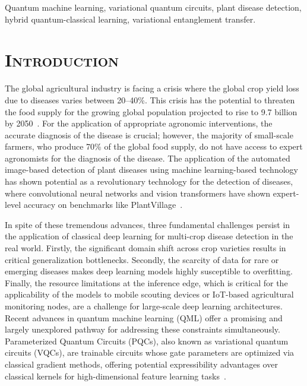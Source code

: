 \documentclass[conference]{IEEEtran}
\begin{document}
\begin{IEEEkeywords}
Quantum machine learning, variational quantum circuits, plant disease detection, hybrid quantum-classical learning, variational entanglement transfer.
\end{IEEEkeywords}

\section{\textsc{Introduction}}

The global agricultural industry is facing a crisis where the global crop yield loss due to diseases varies between 20--40\%. This crisis has the potential to threaten the food supply for the growing global population projected to rise to 9.7 billion by 2050~\cite{fao2023}. For the application of appropriate agronomic interventions, the accurate diagnosis of the disease is crucial; however, the majority of small-scale farmers, who produce 70\% of the global food supply, do not have access to expert agronomists for the diagnosis of the disease. The application of the automated image-based detection of plant diseases using machine learning-based technology has shown potential as a revolutionary technology for the detection of diseases, where convolutional neural networks and vision transformers have shown expert-level accuracy on benchmarks like PlantVillage~\cite{mohanty2016}.

In spite of these tremendous advances, three fundamental challenges persist in the application of classical deep learning for multi-crop disease detection in the real world. Firstly, the significant domain shift across crop varieties results in critical generalization bottlenecks. Secondly, the scarcity of data for rare or emerging diseases makes deep learning models highly susceptible to overfitting. Finally, the resource limitations at the inference edge, which is critical for the applicability of the models to mobile scouting devices or IoT-based agricultural monitoring nodes, are a challenge for large-scale deep learning architectures. Recent advances in quantum machine learning (QML) offer a promising and largely unexplored pathway for addressing these constraints simultaneously. Parameterized Quantum Circuits (PQCs), also known as variational quantum circuits (VQCs), are trainable circuits whose gate parameters are optimized via classical gradient methods, offering potential expressibility advantages over classical kernels for high-dimensional feature learning tasks~\cite{biamonte2017}.
\end{document}
